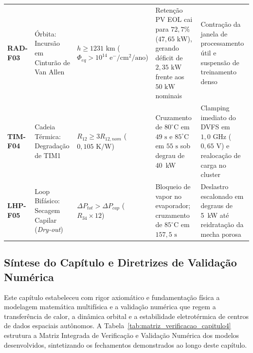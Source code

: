\begin{table}[!ht]
{\begin{tabular}{lp{3.2cm}p{3.4cm}p{3.6cm}p{4.4cm}}
\textbf{RAD-F03}& Órbita: Incursão em Cinturão de Van Allen & $h \ge 1231\text{ km}$ ($\Phi_{eq} > 10^{14}\text{ e}^-/\text{cm}^2/\text{ano}$) & Retenção PV EOL cai para $72{,}7\%$ ($47{,}65\text{ kW}$), gerando déficit de $2{,}35\text{ kW}$ frente aos $50\text{ kW}$ nominais & Contração da janela de processamento útil e suspensão de treinamento denso \\
\textbf{TIM-F04}& Cadeia Térmica: Degradação de TIM1 & $R_{12} \ge 3 R_{12,nom}$ ($0{,}105\text{ K/W}$) & Cruzamento de $80^\circ\text{C}$ em $49\text{ s}$ e $85^\circ\text{C}$ em $55\text{ s}$ sob degrau de 40~kW & Clamping imediato do DVFS em $1{,}0\text{ GHz}$ ($0{,}65\text{ V}$) e realocação de carga no cluster \\
\textbf{LHP-F05}& Loop Bifásico: Secagem Capilar (\textit{Dry-out}) & $\Delta P_{tot} > \Delta P_{cap}$ ($R_{34} \times 12$) & Bloqueio de vapor no evaporador; cruzamento de $85^\circ\text{C}$ em $157{,}5\text{ s}$ & Deslastro escalonado em degraus de 5~kW até reidratação da mecha porosa \\ \hline
\end{tabular}%
}
\end{table}

\subsection{Síntese do Capítulo e Diretrizes de Validação Numérica}
\label{sec:sintese_capitulo4}

Este capítulo estabeleceu com rigor axiomático e fundamentação física a modelagem matemática multifísica e a validação numérica que regem a transferência de calor, a dinâmica orbital e a estabilidade eletrotérmica de centros de dados espaciais autônomos. A Tabela~\ref{tab:matriz_verificacao_capitulo4} estrutura a Matriz Integrada de Verificação e Validação Numérica dos modelos desenvolvidos, sintetizando os fechamentos demonstrados ao longo deste capítulo.

